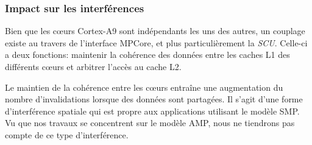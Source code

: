 


        \subsubsection{Impact sur les interférences}
        \label{processeur:impacts_sur_nos_travaux}
        Bien que les cœurs Cortex-A9 sont indépendants les uns des autres, un couplage existe au travers de l'interface MPCore, et plus particulièrement la \emph{SCU}. 
        Celle-ci a deux fonctions: maintenir la cohérence des données entre les caches L1 des différents cœurs et arbitrer l'accès au cache L2.

        Le maintien de la cohérence entre les cœurs entraîne une augmentation du nombre d'invalidations lorsque des données sont partagées.
        Il s'agit d'une forme d'interférence spatiale qui est propre aux applications utilisant le modèle SMP.
        Vu que nos travaux se concentrent sur le modèle AMP, nous ne tiendrons pas compte de ce type d'interférence.
 

